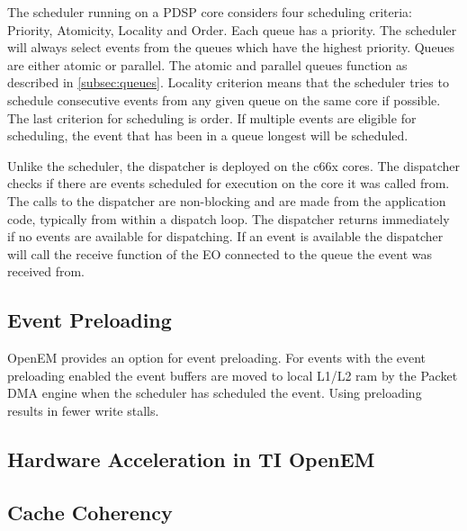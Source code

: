 The scheduler running on a PDSP core considers four scheduling criteria: Priority, Atomicity, Locality and Order. Each queue has a priority. The scheduler will always select events from the queues which have the highest priority. Queues are either atomic or parallel. The atomic and parallel queues function as described in \ref{subsec:queues}. Locality criterion means that the scheduler tries to schedule consecutive events from any given queue on the same core if possible. The last criterion for scheduling is order. If multiple events are eligible for scheduling, the event that has been in a queue longest will be scheduled. \cite{openemwhite}

 Unlike the scheduler, the dispatcher is deployed on the c66x cores. The dispatcher checks if there are events scheduled for execution on the core it was called from. The calls to the dispatcher are non-blocking and are made from the application code, typically from within a dispatch loop. The dispatcher returns immediately if no events are available for dispatching. If an event is available the dispatcher will call the receive function of the EO connected to the queue the event was received from.~\cite{openemwhite}

\subsection{Event Preloading}
\label{subsec:ti-preloading}
OpenEM provides an option for event preloading. For events with the event preloading enabled the event buffers are moved to local L1/L2 ram by the Packet DMA engine  when the scheduler has scheduled the event. Using preloading results in fewer write stalls. \cite{openemwhite}  

\subsection{Hardware Acceleration in TI OpenEM}
\label{subsec:ti-acceleration}

\subsection{Cache Coherency}
\label{subsec:ti-cache-coherency}

